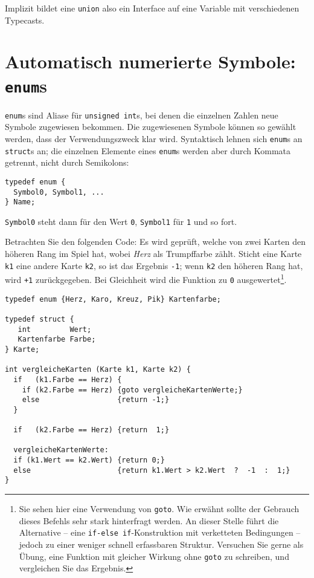 Implizit bildet eine \texttt{union} also ein Interface auf eine Variable mit verschiedenen Typecasts.

\section{Automatisch numerierte Symbole: \texttt{enum}s}
\texttt{enum}s sind Aliase für \texttt{unsigned int}s, bei denen die einzelnen Zahlen neue Symbole zugewiesen bekommen. Die zugewiesenen Symbole können so gewählt werden, dass der Verwendungszweck klar wird. Syntaktisch lehnen sich \texttt{enum}s an \texttt{struct}s an; die einzelnen Elemente eines \texttt{enum}s werden aber durch Kommata getrennt, nicht durch Semikolons:

\begin{codebox}
\begin{verbatim}
typedef enum {
  Symbol0, Symbol1, ...
} Name;
\end{verbatim}
\end{codebox}
\texttt{Symbol0} steht dann für den Wert \texttt{0}, \texttt{Symbol1} für \texttt{1} und so fort.

Betrachten Sie den folgenden Code: Es wird geprüft, welche von zwei Karten den höheren Rang im Spiel hat, wobei \emph{Herz} als Trumpffarbe zählt. Sticht eine Karte \texttt{k1} eine andere Karte \texttt{k2}, so ist das Ergebnis \texttt{-1}; wenn \texttt{k2} den höheren Rang hat, wird \texttt{+1} zurückgegeben. Bei Gleichheit wird die Funktion zu \texttt{0} ausgewertet\footnote{Sie sehen hier eine Verwendung von \texttt{goto}. Wie erwähnt sollte der Gebrauch dieses Befehls sehr stark hinterfragt werden. An dieser Stelle führt die Alternative -- eine \texttt{if-else if}-Konstruktion mit verketteten Bedingungen -- jedoch zu einer weniger schnell erfassbaren Struktur. Versuchen Sie gerne als Übung, eine Funktion mit gleicher Wirkung ohne \texttt{goto} zu schreiben, und vergleichen Sie das Ergebnis.}.
\begin{codebox}
\begin{verbatim}
typedef enum {Herz, Karo, Kreuz, Pik} Kartenfarbe;

typedef struct {
   int         Wert;
   Kartenfarbe Farbe;
} Karte;

int vergleicheKarten (Karte k1, Karte k2) {
  if   (k1.Farbe == Herz) {
    if (k2.Farbe == Herz) {goto vergleicheKartenWerte;}
    else                  {return -1;}
  }

  if   (k2.Farbe == Herz) {return  1;}

  vergleicheKartenWerte:
  if (k1.Wert == k2.Wert) {return 0;}
  else                    {return k1.Wert > k2.Wert  ?  -1  :  1;}
}
\end{verbatim}
\end{codebox}


